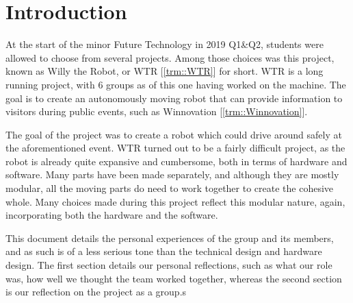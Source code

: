 \section{Introduction}
At the start of the minor Future Technology in 2019 Q1\&Q2, students were allowed to choose from several projects.
Among those choices was this project, known as Willy the Robot, or WTR [\ref{trm::WTR}] for short.
WTR is a long running project, with 6 groups as of this one having worked on the machine.
The goal is to create an autonomously moving robot that can provide information to visitors during public events, such as Winnovation [\ref{trm::Winnovation}].

The goal of the project was to create a robot which could drive around safely at the aforementioned event.
WTR turned out to be a fairly difficult project, as the robot is already quite expansive and cumbersome, both in terms of hardware and software.
Many parts have been made separately, and although they are mostly modular, all the moving parts do need to work together to create the cohesive whole.
Many choices made during this project reflect this modular nature, again, incorporating both the hardware and the software.

This document details the personal experiences of the group and its members, and as such is of a less serious tone than the technical design and hardware design.
The first section details our personal reflections, such as what our role was, how well we thought the team worked together, whereas the second section is our reflection on the project as a group.s

\newpage
